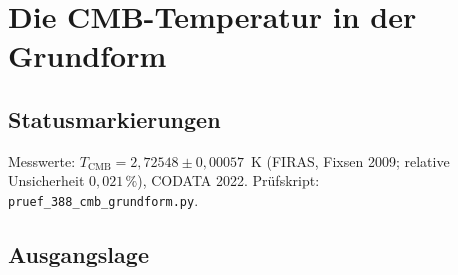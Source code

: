 
\providecommand{\BM}{\textbf{[B]}}
\providecommand{\KM}{\textbf{[K]}}
\providecommand{\SM}{\textbf{[S]}}
\providecommand{\XM}{\textbf{[X]}}
\providecommand{\QM}{\textbf{[Q]}}

\chapter*{Die CMB-Temperatur in der Grundform}

\begin{abstract}
Die Casimir-CMB-Verbindung ist eine Identität, weil die Länge $L_\xi$ allein über die
CMB-Temperatur festgelegt ist (R136). Dieses Dokument stellt alle Wege zusammen, die
$T_{\mathrm{CMB}}$ ohne diese Zirkularität aus $\xi$ gewinnen sollen, und rechnet sie in der
Grundform nach: natürliche Einheiten mit $\alpha=1$, ein einziger Anker $m_e$. Die eV-Relation
$T_{\mathrm{CMB}}=\frac{16}{9}\xi$~eV mit Korrektur zweiter Ordnung trifft auf $2\times10^{-6}$,
gilt aber nur in der Einheit eV, deren Größe 1881 festgelegt und 2019 exakt gesetzt wurde. In
der Grundform hängt $T_{\mathrm{CMB}}/m_e$ an einer einzigen Zahl. Der Kandidat
$T_{\mathrm{CMB}}/m_e=(8\pi)^{1/4}\,\xi^{5/2}$ trifft den FIRAS-Wert auf $0{,}12\sigma$, ergibt mit
der $H_0$-Form des Korpus $T_{\mathrm{CMB}}^4=16\,H_0\,m_e^3$ und macht $L_\xi$ unabhängig von der
CMB. Die $H_0$-Form mit Exponent~10 passt dazu, die ältere mit $41/4$ liegt $11\sigma$ daneben.
Hergeleitet sind weder der Vorfaktor noch der Exponent; was offen bleibt, steht am Ende.
\end{abstract}

\section*{Statusmarkierungen}

Messwerte: $T_{\mathrm{CMB}}=2{,}72548\pm0{,}00057$~K (FIRAS, Fixsen 2009; relative Unsicherheit
$0{,}021\,\%$), CODATA 2022. Prüfskript: \texttt{pruef\_388\_cmb\_grundform.py}.

\section{Ausgangslage}

